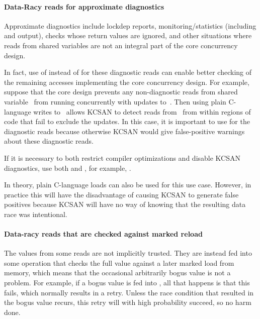 \paragraph{Data-Racy reads for approximate diagnostics}

Approximate diagnostics include lockdep reports, monitoring/statistics
(including  and  output), 
checks whose return values are ignored, and other situations where reads
from shared variables are not an integral part of the core concurrency design.

In fact, use of  instead of  for these diagnostic
reads can enable better checking of the remaining accesses implementing
the core concurrency design.
For example, suppose that the core design prevents any non-diagnostic
reads from shared variable~ from running concurrently with updates
to~.
Then using plain C-language writes to~ allows KCSAN to detect reads
from~ from within regions of code that fail to exclude the updates.
In this case, it is important to use  for the diagnostic
reads because otherwise KCSAN would give false-positive warnings about
these diagnostic reads.

If it is necessary to both restrict compiler optimizations and disable
KCSAN diagnostics, use both  and , for example,
.

In theory, plain C-language loads can also be used for this use case.
However, in practice this will have the disadvantage of causing KCSAN
to generate false positives because KCSAN will have no way of knowing
that the resulting data race was intentional.


\paragraph{Data-racy reads that are checked against marked reload}

The values from some reads are not implicitly trusted.
They are instead fed into some operation that checks the full value
against a later marked load from memory, which means that the occasional
arbitrarily bogus value is not a problem.
For example, if a bogus value is fed into , all that happens
is that this  fails, which normally results in a retry.
Unless the race condition that resulted in the bogus value recurs, this
retry will with high probability succeed, so no harm done.

